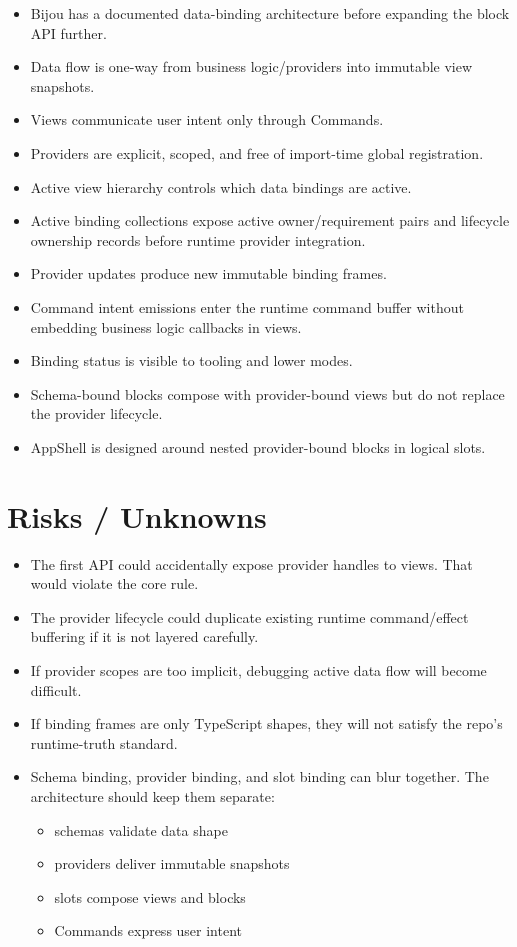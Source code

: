 \begin{itemize}
\tightlist
\item
  Bijou has a documented data-binding architecture before expanding the block API further.
\item
  Data flow is one-way from business logic/providers into immutable view snapshots.
\item
  Views communicate user intent only through Commands.
\item
  Providers are explicit, scoped, and free of import-time global registration.
\item
  Active view hierarchy controls which data bindings are active.
\item
  Active binding collections expose active owner/requirement pairs and lifecycle ownership records before runtime provider integration.
\item
  Provider updates produce new immutable binding frames.
\item
  Command intent emissions enter the runtime command buffer without embedding business logic callbacks in views.
\item
  Binding status is visible to tooling and lower modes.
\item
  Schema-bound blocks compose with provider-bound views but do not replace the provider lifecycle.
\item
  AppShell is designed around nested provider-bound blocks in logical slots.
\end{itemize}

\section{Risks / Unknowns}\label{record-132-risks-unknowns}

\begin{itemize}
\tightlist
\item
  The first API could accidentally expose provider handles to views. That would violate the core rule.
\item
  The provider lifecycle could duplicate existing runtime command/effect buffering if it is not layered carefully.
\item
  If provider scopes are too implicit, debugging active data flow will become difficult.
\item
  If binding frames are only TypeScript shapes, they will not satisfy the repo's runtime-truth standard.
\item
  Schema binding, provider binding, and slot binding can blur together. The architecture should keep them separate:

  \begin{itemize}
  \tightlist
  \item
    schemas validate data shape
  \item
    providers deliver immutable snapshots
  \item
    slots compose views and blocks
  \item
    Commands express user intent
  \end{itemize}
\end{itemize}

